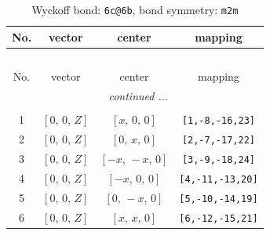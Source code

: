 \documentclass[fleqn,8pt]{jsarticle}
\begin{document}
\begin{longtable}{cccc}
\caption{Wyckoff bond: {\tt 6c@6b}, bond symmetry: {\tt m2m}}
 \\
 \hline \hline
No. & vector & center & mapping \\ \hline \endfirsthead

\multicolumn{3}{l}{\tablename\ \thetable{}} \\
 \hline \hline
No. & vector & center & mapping \\ \hline \endhead

 \hline \hline
\multicolumn{3}{r}{\footnotesize\it continued ...} \\ \endfoot

 \hline \hline
\multicolumn{3}{r}{} \\ \endlastfoot

1 & $\left[ 0,\, 0,\, Z \right]$ & $\left[ x,\, 0,\, 0 \right]$ & {\tt [1,-8,-16,23]} \\ \hline
2 & $\left[ 0,\, 0,\, Z \right]$ & $\left[ 0,\, x,\, 0 \right]$ & {\tt [2,-7,-17,22]} \\ \hline
3 & $\left[ 0,\, 0,\, Z \right]$ & $\left[ - x,\, - x,\, 0 \right]$ & {\tt [3,-9,-18,24]} \\ \hline
4 & $\left[ 0,\, 0,\, Z \right]$ & $\left[ - x,\, 0,\, 0 \right]$ & {\tt [4,-11,-13,20]} \\ \hline
5 & $\left[ 0,\, 0,\, Z \right]$ & $\left[ 0,\, - x,\, 0 \right]$ & {\tt [5,-10,-14,19]} \\ \hline
6 & $\left[ 0,\, 0,\, Z \right]$ & $\left[ x,\, x,\, 0 \right]$ & {\tt [6,-12,-15,21]} \\
\end{longtable}
\renewcommand{\arraystretch}{1.2}
\end{document}
